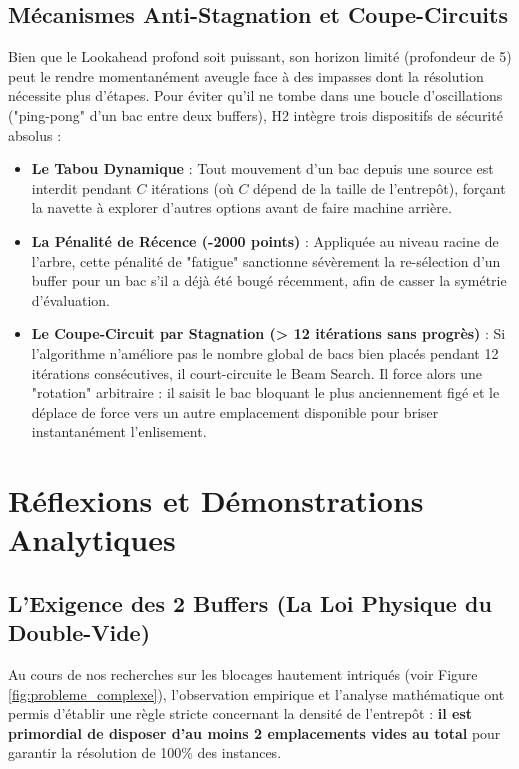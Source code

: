 \documentclass[11pt,a4paper]{article}
\begin{document}
\subsection{Mécanismes Anti-Stagnation et Coupe-Circuits}
Bien que le Lookahead profond soit puissant, son horizon limité (profondeur de 5) peut le rendre momentanément aveugle face à des impasses dont la résolution nécessite plus d'étapes. Pour éviter qu'il ne tombe dans une boucle d'oscillations ("ping-pong" d'un bac entre deux buffers), H2 intègre trois dispositifs de sécurité absolus :
\begin{itemize}
    \item \textbf{Le Tabou Dynamique} : Tout mouvement d'un bac depuis une source est interdit pendant $C$ itérations (où $C$ dépend de la taille de l'entrepôt), forçant la navette à explorer d'autres options avant de faire machine arrière.
    \item \textbf{La Pénalité de Récence (-2000 points)} : Appliquée au niveau racine de l'arbre, cette pénalité de "fatigue" sanctionne sévèrement la re-sélection d'un buffer pour un bac s'il a déjà été bougé récemment, afin de casser la symétrie d'évaluation.
    \item \textbf{Le Coupe-Circuit par Stagnation (> 12 itérations sans progrès)} : Si l'algorithme n'améliore pas le nombre global de bacs bien placés pendant 12 itérations consécutives, il court-circuite le Beam Search. Il force alors une "rotation" arbitraire : il saisit le bac bloquant le plus anciennement figé et le déplace de force vers un autre emplacement disponible pour briser instantanément l'enlisement.
\end{itemize}

\section{Réflexions et Démonstrations Analytiques}

\subsection{L'Exigence des 2 Buffers (La Loi Physique du Double-Vide)}

Au cours de nos recherches sur les blocages hautement intriqués (voir Figure \ref{fig:probleme_complexe}), l'observation empirique et l'analyse mathématique ont permis d'établir une règle stricte concernant la densité de l'entrepôt : \textbf{il est primordial de disposer d'au moins 2 emplacements vides au total} pour garantir la résolution de 100\% des instances.
\end{document}
